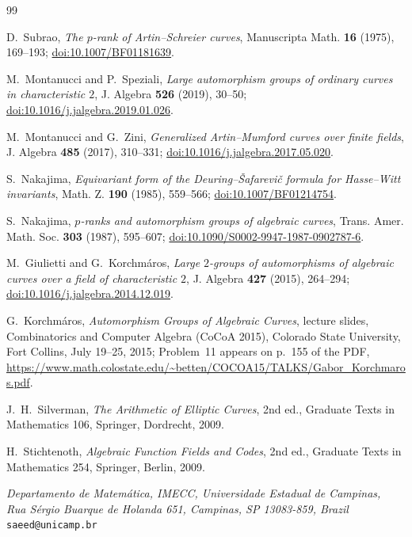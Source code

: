 \documentclass[11pt]{article}
\theoremstyle{remark}
\newcommand{\doi}[1]{\href{https://doi.org/#1}{doi:#1}}
\begin{document}
\begin{thebibliography}{99}

D.~Subrao,
\emph{The $p$-rank of Artin--Schreier curves},
Manuscripta Math. \textbf{16} (1975), 169--193;
\doi{10.1007/BF01181639}.

M.~Montanucci and P.~Speziali,
\emph{Large automorphism groups of ordinary curves in characteristic $2$},
J. Algebra \textbf{526} (2019), 30--50;
\doi{10.1016/j.jalgebra.2019.01.026}.

M.~Montanucci and G.~Zini,
\emph{Generalized Artin--Mumford curves over finite fields},
J. Algebra \textbf{485} (2017), 310--331;
\doi{10.1016/j.jalgebra.2017.05.020}.

S.~Nakajima,
\emph{Equivariant form of the Deuring--{\v S}afarevi{\v c} formula for Hasse--Witt invariants},
Math. Z. \textbf{190} (1985), 559--566;
\doi{10.1007/BF01214754}.

S.~Nakajima,
\emph{$p$-ranks and automorphism groups of algebraic curves},
Trans. Amer. Math. Soc. \textbf{303} (1987), 595--607;
\doi{10.1090/S0002-9947-1987-0902787-6}.

M.~Giulietti and G.~Korchm\'aros,
\emph{Large $2$-groups of automorphisms of algebraic curves over a field of characteristic $2$},
J. Algebra \textbf{427} (2015), 264--294;
\doi{10.1016/j.jalgebra.2014.12.019}.

G.~Korchm\'aros,
\emph{Automorphism Groups of Algebraic Curves},
lecture slides, Combinatorics and Computer Algebra (CoCoA 2015),
Colorado State University, Fort Collins, July 19--25, 2015;
Problem~11 appears on p.~155 of the PDF,
\url{https://www.math.colostate.edu/~betten/COCOA15/TALKS/Gabor_Korchmaros.pdf}.

J.~H.~Silverman,
\emph{The Arithmetic of Elliptic Curves},
2nd ed., Graduate Texts in Mathematics 106, Springer, Dordrecht, 2009.

H.~Stichtenoth,
\emph{Algebraic Function Fields and Codes},
2nd ed., Graduate Texts in Mathematics 254, Springer, Berlin, 2009.

\end{thebibliography}

\bigskip
\noindent
\textit{Departamento de Matem\'atica, IMECC, Universidade Estadual de Campinas,\\
Rua S\'ergio Buarque de Holanda 651, Campinas, SP 13083-859, Brazil}\\
\texttt{saeed@unicamp.br}
\end{document}
